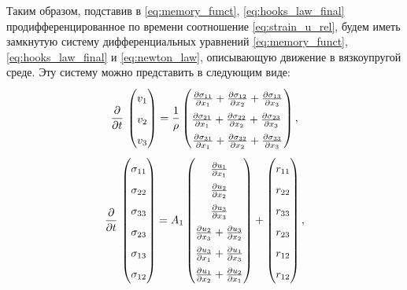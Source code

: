 \documentclass[a4paper, fontsize=14pt]{article}
\begin{document}
Таким образом, подставив в \eqref{eq:memory_funct}, \eqref{eq:hooks_law_final} продифференцированное по времени соотношение \eqref{eq:strain_u_rel}, будем иметь замкнутую систему дифференциальных уравнений \eqref{eq:memory_funct}, \eqref{eq:hooks_law_final} и \eqref{eq:newton_law}, описывающую движение в вязкоупругой среде.
Эту систему можно представить в следующим виде:
\begin{equation}
    \label{eq:system_on_v}
    \renewcommand\arraystretch{1.6}
    \frac{\partial }{\partial t}\, 
    \begin{pmatrix}
        v_1 \\
        v_2 \\
        v_3
    \end{pmatrix} =
    \frac{1}{\rho} 
    \begin{pmatrix} 
        \frac{\partial \sigma_{11}}{\partial x_1} +  \frac{\partial \sigma_{12}}{\partial x_2} + \frac{\partial \sigma_{13}}{\partial x_3} \\
        \frac{\partial \sigma_{21}}{\partial x_1} +  \frac{\partial \sigma_{22}}{\partial x_2} + \frac{\partial \sigma_{23}}{\partial x_3}\, \\
        \frac{\partial \sigma_{31}}{\partial x_1} +  \frac{\partial \sigma_{32}}{\partial x_2} + \frac{\partial \sigma_{33}}{\partial x_3}
    \end{pmatrix},
\end{equation}
\begin{equation}
    \label{eq:system_on_sigma}
    \renewcommand\arraystretch{1.6}
    \frac{\partial }{\partial t}\, 
    \begin{pmatrix}
        \sigma_{11} \\
        \sigma_{22} \\
        \sigma_{33} \\
        \sigma_{23} \\
        \sigma_{13} \\
        \sigma_{12}
    \end{pmatrix} = A_1
    \begin{pmatrix} 
    \frac{\partial u_1}{\partial x_1} \\
    \frac{\partial u_2}{\partial x_2} \\
    \frac{\partial u_3}{\partial x_3} \\
    \frac{\partial u_2}{\partial x_3} + \frac{\partial u_3}{\partial x_2} \\
    \frac{\partial u_3}{\partial x_1} + \frac{\partial u_1}{\partial x_3} \\
    \frac{\partial u_1}{\partial x_2} + \frac{\partial u_2}{\partial x_1}
    \end{pmatrix} +
    \begin{pmatrix} 
    r_{11} \\
    r_{22} \\
    r_{33} \\
    r_{23} \\
    r_{12} \\
    r_{12} 
    \end{pmatrix},
\end{equation}
\end{document}
